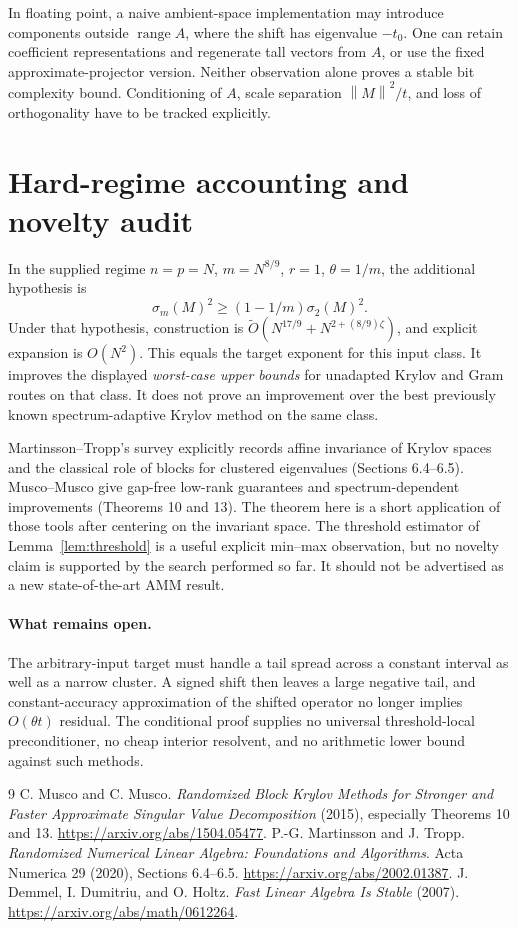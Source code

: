\documentclass[11pt]{article}
\newcommand{\norm}[1]{\left\lVert #1\right\rVert}
\newcommand{\range}{\operatorname{range}}
\newcommand{\tO}{\widetilde O}
\begin{document}
In floating point, a naive ambient-space implementation may introduce
components outside \(\range A\), where the shift has eigenvalue
\(-t_0\). One can retain coefficient representations and regenerate
tall vectors from \(A\), or use the fixed approximate-projector
version. Neither observation alone proves a stable bit complexity bound.
Conditioning of \(A\), scale separation \(\norm M^2/t\), and
loss of orthogonality have to be tracked explicitly.

\section{Hard-regime accounting and novelty audit}
In the supplied regime
\(n=p=N\), \(m=N^{8/9}\), \(r=1\), \(\theta=1/m\),
the additional hypothesis is
\[
 \sigma_m(M)^2\ge(1-1/m)\sigma_2(M)^2.
\]
Under that hypothesis, construction is
\(\tO(N^{17/9}+N^{2+(8/9)\zeta})\), and explicit expansion is
\(O(N^2)\). This equals the target exponent for this input class.
It improves the displayed \emph{worst-case upper bounds} for unadapted
Krylov and Gram routes on that class. It does not prove an improvement
over the best previously known spectrum-adaptive Krylov method on the
same class.

Martinsson--Tropp's survey explicitly records affine invariance of Krylov
spaces and the classical role of blocks for clustered eigenvalues
(Sections 6.4--6.5). Musco--Musco give gap-free low-rank guarantees and
spectrum-dependent improvements (Theorems 10 and 13). The theorem here
is a short application of those tools after centering on the invariant
space. The threshold estimator of Lemma~\ref{lem:threshold} is a useful
explicit min--max observation, but no novelty claim is supported by the
search performed so far. It should not be advertised as a new
state-of-the-art AMM result.

\paragraph{What remains open.}
The arbitrary-input target must handle a tail spread across a constant
interval as well as a narrow cluster. A signed shift then leaves a
large negative tail, and constant-accuracy approximation of the shifted
operator no longer implies \(O(\theta t)\) residual. The conditional
proof supplies no universal threshold-local preconditioner, no cheap
interior resolvent, and no arithmetic lower bound against such methods.

\begin{thebibliography}{9}
C. Musco and C. Musco.
\emph{Randomized Block Krylov Methods for Stronger and Faster Approximate
Singular Value Decomposition} (2015), especially Theorems 10 and 13.
\url{https://arxiv.org/abs/1504.05477}.
P.-G. Martinsson and J. Tropp.
\emph{Randomized Numerical Linear Algebra: Foundations and Algorithms}.
Acta Numerica 29 (2020), Sections 6.4--6.5.
\url{https://arxiv.org/abs/2002.01387}.
J. Demmel, I. Dumitriu, and O. Holtz.
\emph{Fast Linear Algebra Is Stable} (2007).
\url{https://arxiv.org/abs/math/0612264}.
\end{thebibliography}
\end{document}
